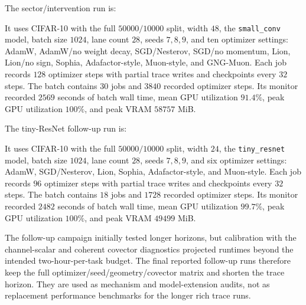 The sector/intervention run is:
\begin{center}
\small{}
\end{center}
It uses CIFAR-10 with the full $50000/10000$ split, width $48$, the
\texttt{small\_conv} model, batch size $1024$, lane count $28$, seeds
$7,8,9$, and ten optimizer settings: AdamW, AdamW/no weight decay,
SGD/Nesterov, SGD/no momentum, Lion, Lion/no sign, Sophia,
Adafactor-style, Muon-style, and GNG-Muon.
Each job records $128$ optimizer steps with partial trace writes and
checkpoints every $32$ steps.  The batch contains $30$ jobs and $3840$
recorded optimizer steps.  Its monitor recorded $2569$ seconds of batch wall
time, mean GPU utilization $91.4\%$, peak GPU utilization $100\%$, and peak
VRAM $58757$ MiB.

The tiny-ResNet follow-up run is:
\begin{center}
\small{}
\end{center}
It uses CIFAR-10 with the full $50000/10000$ split, width $24$, the
\texttt{tiny\_resnet} model, batch size $1024$, lane count $28$, seeds
$7,8,9$, and six optimizer settings: AdamW, SGD/Nesterov, Lion, Sophia,
Adafactor-style, and Muon-style.  Each job records $96$ optimizer steps with
partial trace writes and checkpoints every $32$ steps.  The batch contains
$18$ jobs and $1728$ recorded optimizer steps.  Its monitor recorded $2482$
seconds of batch wall time, mean GPU utilization $99.7\%$, peak GPU
utilization $100\%$, and peak VRAM $49499$ MiB.

The follow-up campaign initially tested longer horizons, but calibration with
the channel-scalar and coherent covector diagnostics projected runtimes beyond
the intended two-hour-per-task budget.  The final reported follow-up runs
therefore keep the full optimizer/seed/geometry/covector matrix and shorten
the trace horizon.  They are used as mechanism and model-extension audits,
not as replacement performance benchmarks for the longer rich trace runs.

